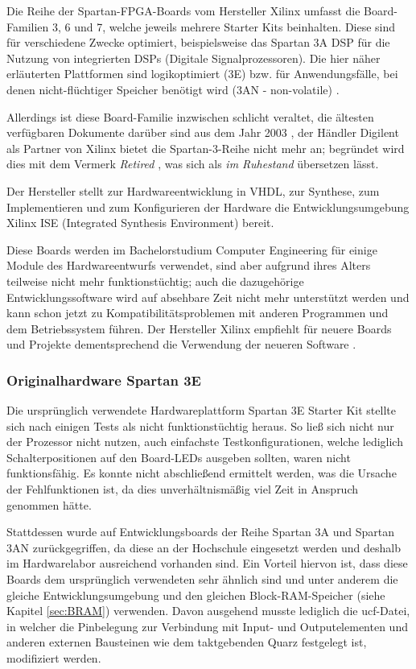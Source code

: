 \documentclass[11pt,a4paper,titlepage]{article}
\begin{document}
Die Reihe der Spartan-FPGA-Boards vom Hersteller Xilinx umfasst die Board-Familien 3, 6 und 7, welche jeweils mehrere Starter Kits beinhalten. Diese sind für verschiedene Zwecke optimiert, beispielsweise das Spartan 3A DSP für die Nutzung von integrierten DSPs (Digitale Signalprozessoren). Die hier näher erläuterten Plattformen sind logikoptimiert (3E) bzw. für Anwendungsfälle, bei denen nicht-flüchtiger Speicher benötigt wird (3AN - non-volatile) \cite{spartan3}.

Allerdings ist diese Board-Familie inzwischen schlicht veraltet, die ältesten verfügbaren Dokumente darüber sind aus dem Jahr 2003 \cite{spartan3-doku}, der Händler Digilent als Partner von Xilinx \cite{digilent-partner} bietet die Spartan-3-Reihe nicht mehr an; begründet wird dies mit dem Vermerk \textit{Retired} \cite{digilent-spartan}, was sich als \textit{im Ruhestand} übersetzen lässt.

Der Hersteller stellt zur Hardwareentwicklung in VHDL, zur Synthese, zum Implementieren und zum Konfigurieren der Hardware die Entwicklungsumgebung Xilinx ISE (Integrated Synthesis Environment) bereit. 

Diese Boards werden im Bachelorstudium Computer Engineering für einige Module des Hardwareentwurfs verwendet, sind aber aufgrund ihres Alters teilweise nicht mehr funktionstüchtig; auch die dazugehörige Entwicklungssoftware wird auf absehbare Zeit nicht mehr unterstützt werden und kann schon jetzt zu Kompatibilitätsproblemen mit anderen Programmen und dem Betriebssystem führen. Der Hersteller Xilinx empfiehlt für neuere Boards und Projekte dementsprechend die Verwendung der neueren Software \cite{ISE}.

\subsubsection{Originalhardware Spartan 3E}

Die ursprünglich verwendete Hardwareplattform Spartan 3E Starter Kit stellte sich nach einigen Tests als nicht funktionstüchtig heraus. So ließ sich nicht nur der Prozessor nicht nutzen, auch einfachste Testkonfigurationen, welche lediglich Schalterpositionen auf den Board-LEDs ausgeben sollten, waren nicht funktionsfähig. Es konnte nicht abschließend ermittelt werden, was die Ursache der Fehlfunktionen ist, da dies unverhältnismäßig viel Zeit in Anspruch genommen hätte.

Stattdessen wurde auf Entwicklungsboards der Reihe Spartan 3A und Spartan 3AN zurückgegriffen, da diese an der Hochschule eingesetzt werden und deshalb im Hardwarelabor ausreichend vorhanden sind. Ein Vorteil hiervon ist, dass diese Boards dem ursprünglich verwendeten sehr ähnlich sind und unter anderem die gleiche Entwicklungsumgebung und den gleichen Block-RAM-Speicher (siehe Kapitel \ref{sec:BRAM}) verwenden. Davon ausgehend musste lediglich die ucf-Datei, in welcher die Pinbelegung zur Verbindung mit Input- und Outputelementen und anderen externen Bausteinen wie dem taktgebenden Quarz festgelegt ist, modifiziert werden.
\end{document}
